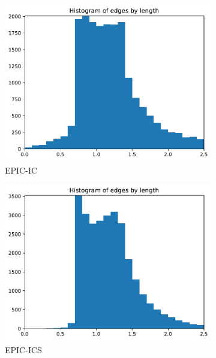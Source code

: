 \documentclass[3p,times,procedia,number]{elsarticle}
\begin{document}
\begin{figure}
\begin{subfigure}{.16\textwidth}
\centering
\includegraphics[width=\textwidth]{epic-ic-cube-cylinder-polar-1-length.pdf}
\caption{EPIC-IC}
\end{subfigure}
\begin{subfigure}{.16\textwidth}
\centering
\includegraphics[width=\textwidth]{epic-ics-cube-cylinder-polar-1-length.pdf}
\caption{EPIC-ICS}
\end{subfigure}
\begin{subfigure}{.16\textwidth}
\centering

\end{subfigure}
\end{figure}
\end{document}
